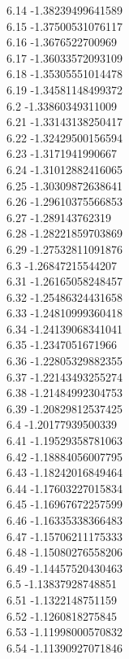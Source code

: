 {6.14	-1.38239499641589\\
6.15	-1.37500531076117\\
6.16	-1.3676522700969\\
6.17	-1.36033572093109\\
6.18	-1.35305551014478\\
6.19	-1.34581148499372\\
6.2	-1.33860349311009\\
6.21	-1.33143138250417\\
6.22	-1.32429500156594\\
6.23	-1.3171941990667\\
6.24	-1.31012882416065\\
6.25	-1.30309872638641\\
6.26	-1.29610375566853\\
6.27	-1.289143762319\\
6.28	-1.28221859703869\\
6.29	-1.27532811091876\\
6.3	-1.26847215544207\\
6.31	-1.26165058248457\\
6.32	-1.25486324431658\\
6.33	-1.24810999360418\\
6.34	-1.24139068341041\\
6.35	-1.2347051671966\\
6.36	-1.22805329882355\\
6.37	-1.22143493255274\\
6.38	-1.21484992304753\\
6.39	-1.20829812537425\\
6.4	-1.20177939500339\\
6.41	-1.19529358781063\\
6.42	-1.18884056007795\\
6.43	-1.18242016849464\\
6.44	-1.17603227015834\\
6.45	-1.16967672257599\\
6.46	-1.16335338366483\\
6.47	-1.15706211175333\\
6.48	-1.15080276558206\\
6.49	-1.14457520430463\\
6.5	-1.13837928748851\\
6.51	-1.1322148751159\\
6.52	-1.1260818275845\\
6.53	-1.11998000570832\\
6.54	-1.11390927071846\\
}
